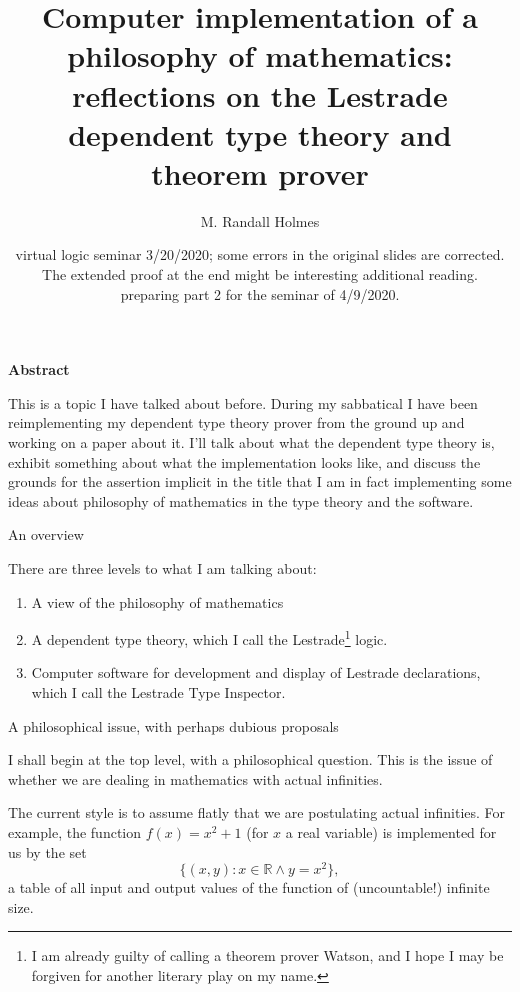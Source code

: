 \documentclass{slides}
\title{ Computer implementation of a philosophy of mathematics:  reflections on the Lestrade dependent type theory and theorem prover}
\author{M. Randall Holmes}
\date {virtual logic seminar 3/20/2020;  some errors in the original slides are corrected.  The extended proof at the end might be interesting additional reading.\\preparing part 2 for the seminar of 4/9/2020.}
\begin{document}
\begin{slide}

\maketitle

\begin{center}{\bf Abstract}\end{center}  This is a topic I have talked about before.  During my sabbatical I have been reimplementing my dependent type theory prover from the ground up and working on a paper about it.  I'll talk about what the dependent type theory is, exhibit something about what the implementation looks like, and discuss the grounds for the assertion implicit in the title that I am in fact implementing some ideas about philosophy of mathematics in the type theory and the software.

\end{slide}

\begin{slide}

{\Large An overview }

There are three levels to what I am talking about:

\begin{enumerate}

\item  A view of the philosophy of mathematics

\item  A dependent type theory, which I call the Lestrade\footnote {I am already guilty of calling a theorem prover Watson, and I hope I may be forgiven for another literary play on my name.} logic.

\item  Computer software for development and display of Lestrade declarations, which I call the Lestrade Type Inspector.

\end{enumerate}


\end{slide}

\begin{slide}

{\Large A philosophical issue, with perhaps dubious proposals}

I shall begin at the top level, with a philosophical question.  This is the issue of whether we are dealing in mathematics with actual infinities.

The current style is to assume flatly that we are postulating actual infinities.  For example, the function $f(x) = x^2+1$ (for $x$ a real variable) is implemented for
us by the set $$\{(x,y): x \in {\mathbb R} \wedge y = x^2\},$$ a table of all input and output values of the function of (uncountable!) infinite size.


\end{slide}
\end{document}
